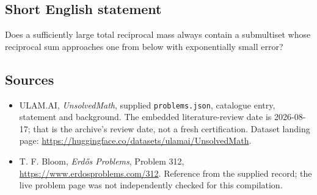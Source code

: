 \documentclass[11pt,a4paper]{article}
\begin{document}
\subsection{Short English statement}

Does a sufficiently large total reciprocal mass always contain a submultiset whose reciprocal sum approaches one from below with exponentially small error?

\subsection{Sources}

{\small

\begin{itemize}

\item[\hypertarget{source:statement:1}{S1}] ULAM.AI, \emph{UnsolvedMath}, supplied \texttt{problems.json}, catalogue entry, statement and background. The embedded literature-review date is 2026-08-17; that is the archive’s review date, not a fresh certification. Dataset landing page: \url{https://huggingface.co/datasets/ulamai/UnsolvedMath}.

\item[\hypertarget{source:statement:2}{S2}] T. F. Bloom, \emph{Erdős Problems}, Problem 312, \url{https://www.erdosproblems.com/312}. Reference from the supplied record; the live problem page was not independently checked for this compilation.

\end{itemize}

}

\label{end:statement}
\end{document}
